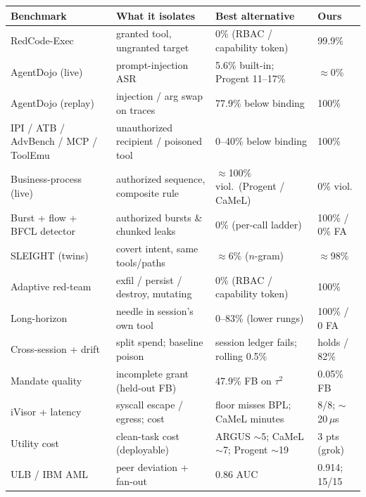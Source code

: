 \documentclass[11pt]{article}
\begin{document}
\pagestyle{empty}

\noindent
\begin{center}
{\footnotesize
\begin{tabular}{@{} B{3.05cm} I{3.55cm} P{5.1cm} R{2.35cm} @{}}
\toprule
\normalfont\bfseries Benchmark
  & \normalfont\bfseries What it isolates
  & \normalfont\bfseries Best alternative
  & \normalfont\bfseries Ours \\
\midrule
RedCode-Exec
  & granted tool, ungranted target
  & 0\% (RBAC / capability token)
  & 99.9\% \\
AgentDojo (live)
  & prompt-injection ASR
  & 5.6\% built-in; Progent 11--17\%
  & $\approx$0\% \\
AgentDojo (replay)
  & injection / arg swap on traces
  & 77.9\% below binding
  & 100\% \\
IPI / ATB / AdvBench / MCP / ToolEmu
  & unauthorized recipient / poisoned tool
  & 0--40\% below binding
  & 100\% \\
Business-process (live)
  & authorized sequence, composite rule
  & $\approx$100\% viol.\ (Progent / CaMeL)
  & 0\% viol. \\
Burst + flow + BFCL detector
  & authorized bursts \& chunked leaks
  & 0\% (per-call ladder)
  & 100\% / 0\% FA \\
SLEIGHT (twins)
  & covert intent, same tools/paths
  & $\approx$6\% ($n$-gram)
  & $\approx$98\% \\
Adaptive red-team
  & exfil / persist / destroy, mutating
  & 0\% (RBAC / capability token)
  & 100\% \\
Long-horizon
  & needle in session's own tool
  & 0--83\% (lower rungs)
  & 100\% / 0 FA \\
Cross-session + drift
  & split spend; baseline poison
  & session ledger fails; rolling 0.5\%
  & holds / 82\% \\
Mandate quality
  & incomplete grant (held-out FB)
  & 47.9\% FB on $\tau^2$
  & 0.05\% FB \\
iVisor + latency
  & syscall escape / egress; cost
  & floor misses BPL; CaMeL minutes
  & 8/8; $\sim$20\,$\mu$s \\
Utility cost
  & clean-task cost (deployable)
  & ARGUS $\sim$5; CaMeL $\sim$7; Progent $\sim$19
  & 3 pts (grok) \\
ULB / IBM AML
  & peer deviation + fan-out
  & 0.86 AUC
  & 0.914; 15/15 \\
\bottomrule
\end{tabular}
}
\end{center}
\end{document}
